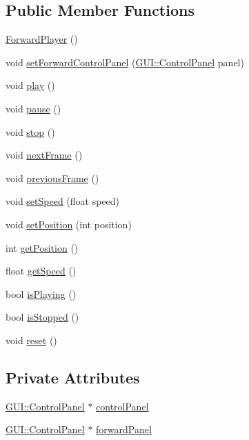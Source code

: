 \subsection*{Public Member Functions}
\begin{DoxyCompactItemize}
\item 
\hyperlink{classGUI_1_1ForwardPlayer_a61bebb272dd2685ca2bfdf72349bc0f1}{Forward\+Player} ()
\item 
void \hyperlink{classGUI_1_1ForwardPlayer_a7b529b38e751d7e01c690df7a28122d5}{set\+Forward\+Control\+Panel} (\hyperlink{classGUI_1_1ControlPanel}{G\+U\+I\+::\+Control\+Panel} panel)
\item 
void \hyperlink{classGUI_1_1ForwardPlayer_a6d58098c6cf63c241ed03bc797256bb1}{play} ()
\item 
void \hyperlink{classGUI_1_1ForwardPlayer_a7167f5c196fc5e167bfabde1a730e81d}{pause} ()
\item 
void \hyperlink{classGUI_1_1ForwardPlayer_a8c528baf37154d347366083f0f816846}{stop} ()
\item 
void \hyperlink{classGUI_1_1ForwardPlayer_a365329da56f8b07f8c95027ba967bbc3}{next\+Frame} ()
\item 
void \hyperlink{classGUI_1_1ForwardPlayer_a3c96ed37c70ebc0b32c527a04e1536d1}{previous\+Frame} ()
\item 
void \hyperlink{classGUI_1_1ForwardPlayer_a5466c67c5ec22359c0702dc4ac8ffb19}{set\+Speed} (float speed)
\item 
void \hyperlink{classGUI_1_1ForwardPlayer_a1aa68f77243229daea38d59bc5145d35}{set\+Position} (int position)
\item 
int \hyperlink{classGUI_1_1ForwardPlayer_a97825791568ee242ca19d25b75030d87}{get\+Position} ()
\item 
float \hyperlink{classGUI_1_1ForwardPlayer_a26ebefde7fe71954e6c1282255951b7d}{get\+Speed} ()
\item 
bool \hyperlink{classGUI_1_1ForwardPlayer_a8438e3403946accc1986a05b89ee7b03}{is\+Playing} ()
\item 
bool \hyperlink{classGUI_1_1ForwardPlayer_a2fc5ff4f369aaa46c55c3ad3c63216d6}{is\+Stopped} ()
\item 
void \hyperlink{classGUI_1_1ForwardPlayer_ad20897c5c8bd47f5d4005989bead0e55}{reset} ()
\end{DoxyCompactItemize}
\subsection*{Private Attributes}
\begin{DoxyCompactItemize}
\item 
\hyperlink{classGUI_1_1ControlPanel}{G\+U\+I\+::\+Control\+Panel} $\ast$ \hyperlink{classGUI_1_1ForwardPlayer_af5025a887047a182dff8f35d6f96e965}{control\+Panel}
\item 
\hyperlink{classGUI_1_1ControlPanel}{G\+U\+I\+::\+Control\+Panel} $\ast$ \hyperlink{classGUI_1_1ForwardPlayer_aefb230389b50dc60b17e50c76f10c686}{forward\+Panel}
\end{DoxyCompactItemize}
